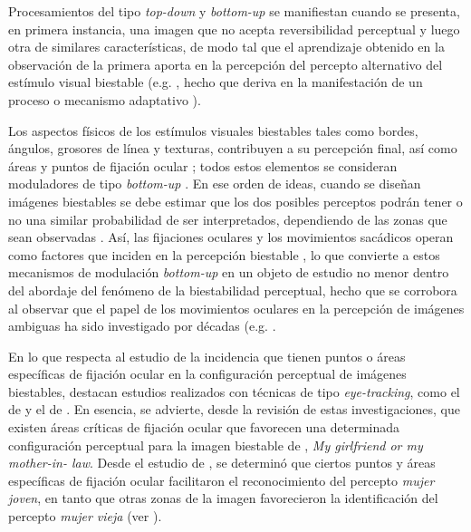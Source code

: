 \documentclass[spanish]{textolivre}
\begin{document}
Procesamientos del tipo \textit{top-down} y \textit{bottom-up} se manifiestan cuando se presenta, en primera instancia, una imagen que no acepta reversibilidad perceptual y luego otra de similares características, de modo tal que el aprendizaje obtenido en la observación de la primera aporta en la percepción del percepto alternativo del estímulo visual biestable (e.g. \cite{qiu_vaseface_2009}, hecho que deriva en la manifestación de un proceso o mecanismo adaptativo \cite{long_how_2007,long_configural_2002,long_prime_1992}).

Los aspectos físicos de los estímulos visuales biestables tales como bordes, ángulos, grosores de línea y texturas, contribuyen a su percepción final, así como áreas y puntos de fijación ocular \cite{meng_can_2004,rodriguez-martinez_ocular_2021}; todos estos elementos se consideran moduladores de tipo \textit{bottom-up} \cite{marroquin-ciendua_modulacion_2020,rodriguez-martinez_perceptual_2022}. En ese orden de ideas, cuando se diseñan imágenes biestables se debe estimar que los dos posibles perceptos podrán tener o no una similar probabilidad de ser interpretados, dependiendo de las zonas que sean observadas \cite{peters_components_2005}. Así, las fijaciones oculares y los movimientos sacádicos operan como factores que inciden en la percepción biestable \cite{marroquin-ciendua_modulacion_2020}, lo que convierte a estos mecanismos de modulación \textit{bottom-up} en un objeto de estudio no menor dentro del abordaje del fenómeno de la biestabilidad perceptual, hecho que se corrobora al observar que el papel de los movimientos oculares en la percepción de imágenes ambiguas ha sido investigado por décadas  (e.g. \textcite{flamm_reversible_1977,holcomb_selective_1977,ellis_eye_1978,groner_eye-movement_1983,van_dam_retinal_2006,marroquin-ciendua_modulacion_2020,rodriguez-martinez_ocular_2021}.

En lo que respecta al estudio de la incidencia que tienen puntos o áreas específicas de fijación ocular en la configuración perceptual de imágenes biestables, destacan estudios realizados con técnicas de tipo \textit{eye-tracking}, como el de \textcite{groner_eye-movement_1983} y el de \textcite{rodriguez-martinez_ocular_2021}. En esencia, se advierte, desde la revisión de estas investigaciones, que existen áreas críticas de fijación ocular que favorecen una determinada configuración perceptual para la imagen biestable de \textcite{boring_new_1930}, \textit{My girlfriend or my mother-in- law}. Desde el estudio de \textcite{groner_eye-movement_1983}, se determinó que ciertos puntos y áreas específicas de fijación ocular facilitaron el reconocimiento del percepto \textit{mujer joven}, en tanto que otras zonas de la imagen favorecieron la identificación del percepto \textit{mujer vieja} (ver ).
\end{document}
